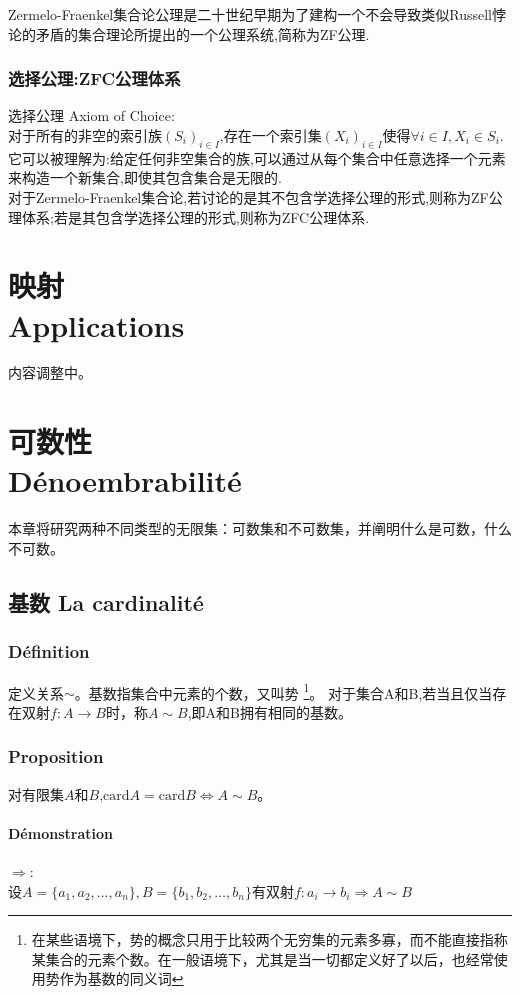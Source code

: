 \documentclass[12pt, a4paper, oneside]{ctexbook}
\begin{document}
  Zermelo-Fraenkel集合论公理是二十世纪早期为了建构一个不会导致类似Russell悖论的矛盾的集合理论所提出的一个公理系统,简称为ZF公理.
  
  \subsection{选择公理:ZFC公理体系}
  \noindent
  选择公理 Axiom of Choice:\\
  对于所有的非空的索引族$(S_i)_{i\in I}$,存在一个索引集$(X_i)_{i\in I}$使得$\forall i\in I,X_i\in S_i $.
  它可以被理解为:给定任何非空集合的族,可以通过从每个集合中任意选择一个元素来构造一个新集合,即使其包含集合是无限的.\\

  对于Zermelo-Fraenkel集合论,若讨论的是其不包含学选择公理的形式,则称为ZF公理体系;若是其包含学选择公理的形式,则称为ZFC公理体系.
  


\chapter{映射\\ Applications}%
内容调整中。

\chapter{可数性\\ Dénoembrabilité}
  本章将研究两种不同类型的无限集：可数集和不可数集，并阐明什么是可数，什么不可数。
\section{基数 La cardinalité}
  \subsection{Définition}
  定义关系$\sim$。基数指集合中元素的个数，又叫势
  \footnote{在某些语境下，势的概念只用于比较两个无穷集的元素多寡，而不能直接指称某集合的元素个数。在一般语境下，尤其是当一切都定义好了以后，也经常使用势作为基数的同义词}。
  对于集合A和B,若当且仅当存在双射$f:A\rightarrow B$时，称$A\sim B$,即A和B拥有相同的基数。
  \subsection{Proposition}\label{myref:youxianji}
  对有限集$A$和$B$,$\text{card}A=\text{card}B\Leftrightarrow A\sim B$。
  \subsubsection{Démonstration}
  \noindent $\Rightarrow$:\\
  设$A=\{a_1,a_2,\dots,a_n\},B=\{b_1,b_2,\dots,b_n\}$有双射$f:a_i\rightarrow b_i\Rightarrow A\sim B$\\
\end{document}
